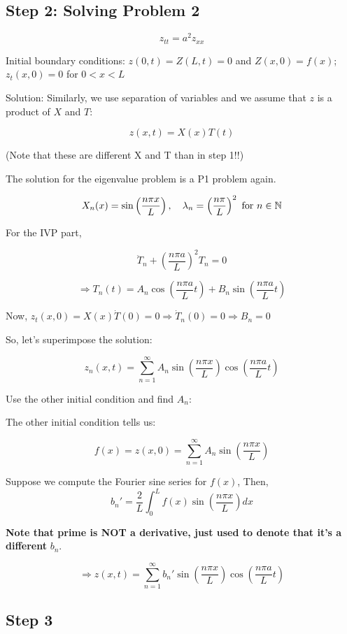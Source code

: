 \documentclass{article}
\begin{document}
\subsection*{Step 2: Solving Problem 2}

$$z_{tt} = a^2 z_{xx}$$

Initial boundary conditions: $z(0,t) = Z(L,t) = 0$ and $Z(x,0) = f(x)$; $z_t (x,0) = 0$ for $0 < x < L$

Solution: Similarly, we use separation of variables and we assume that $z$ is a product of $X$ and $T$:

$$z(x,t) = X(x) T(t)$$

(Note that these are different X and T than in step 1!!)

The solution for the eigenvalue problem is a P1 problem again. 

$$X_n(x) = \sin \left( \frac{n \pi x}{L} \right), \quad \lambda_n = \left( \frac{n \pi}{L} \right)^2 \text{ for } n \in \mathbb{N}$$


For the IVP part, 

$$\ddot{T}_n + \left( \frac{n \pi a}{L} \right)^2 T_n = 0$$

$$\Rightarrow T_n(t) = A_n \cos \left( \frac{n \pi a}{L} t \right) + B_n \sin \left( \frac{n \pi a}{L} t \right)$$

Now, $z_t(x,0) = X(x) \dot{T}(0) = 0 \Rightarrow \dot{T}_n(0) = 0 \Rightarrow B_n = 0$

So, let's superimpose the solution:

$$z_n (x,t) = \sum_{n = 1}^\infty A_n \sin \left( \frac{n \pi x}{L} \right) \cos \left( \frac{n \pi a}{L} t \right)$$

Use the other initial condition and find $A_n$:

The other initial condition tells us:

$$f(x) = z(x,0) = \sum_{n =1}^\infty  A_n \sin \left( \frac{n \pi x}{L} \right)$$

Suppose we compute the Fourier sine series for $f(x)$, Then, $$b_n' = \frac{2}{L} \int_0^L f(x) \sin \left( \frac{n \pi x}{L} \right) dx$$

\textbf{Note that prime is NOT a derivative, just used to denote that it's a different} $b_n$.

$$\Rightarrow z(x,t) = \sum_{n = 1}^\infty b_n' \sin \left( \frac{n \pi x}{L} \right) \cos \left( \frac{n \pi a}{L} t \right)$$

\subsection*{Step 3}
\end{document}
